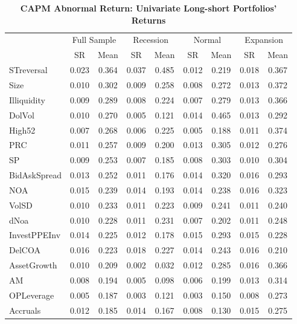 \begin{table}[H]
  \centering
  \footnotesize
  \caption{\textbf{CAPM Abnormal Return: Univariate Long-short Portfolios' Returns}}
  \label{table: capm univariate ls portfolio}
  \begin{tabular}{lcc|cc|cc|cc}
  \hline
      ~ & \multicolumn{2}{c}{Full Sample} & \multicolumn{2}{c}{Recession} & \multicolumn{2}{c}{Normal} & \multicolumn{2}{c}{Expansion} \\
      ~ & SR & Mean & SR & Mean & SR & Mean & SR & Mean \\ \hline
      STreversal & 0.023 & 0.364 & 0.037 & 0.485 & 0.012 & 0.219 & 0.018 & 0.367 \\ 
      Size & 0.010 & 0.302 & 0.009 & 0.258 & 0.008 & 0.272 & 0.013 & 0.372 \\ 
      Illiquidity & 0.009 & 0.289 & 0.008 & 0.224 & 0.007 & 0.279 & 0.013 & 0.366 \\ 
      DolVol & 0.010 & 0.270 & 0.005 & 0.121 & 0.014 & 0.465 & 0.013 & 0.292 \\ 
      High52 & 0.007 & 0.268 & 0.006 & 0.225 & 0.005 & 0.188 & 0.011 & 0.374 \\ 
      PRC & 0.011 & 0.257 & 0.009 & 0.200 & 0.013 & 0.305 & 0.012 & 0.276 \\ 
      SP & 0.009 & 0.253 & 0.007 & 0.185 & 0.008 & 0.303 & 0.010 & 0.304 \\ 
      BidAskSpread & 0.013 & 0.252 & 0.011 & 0.176 & 0.014 & 0.320 & 0.016 & 0.293 \\ 
      NOA & 0.015 & 0.239 & 0.014 & 0.193 & 0.014 & 0.238 & 0.016 & 0.323 \\ 
      VolSD & 0.010 & 0.233 & 0.011 & 0.223 & 0.009 & 0.241 & 0.011 & 0.240 \\ 
      dNoa & 0.010 & 0.228 & 0.011 & 0.231 & 0.007 & 0.202 & 0.011 & 0.248 \\ 
      InvestPPEInv & 0.014 & 0.225 & 0.012 & 0.178 & 0.015 & 0.293 & 0.015 & 0.228 \\ 
      DelCOA & 0.016 & 0.223 & 0.018 & 0.227 & 0.014 & 0.243 & 0.016 & 0.210 \\ 
      AssetGrowth & 0.010 & 0.209 & 0.002 & 0.032 & 0.012 & 0.285 & 0.016 & 0.366 \\ 
      AM & 0.008 & 0.194 & 0.005 & 0.098 & 0.006 & 0.199 & 0.013 & 0.314 \\ 
      OPLeverage & 0.005 & 0.187 & 0.003 & 0.121 & 0.003 & 0.150 & 0.008 & 0.273 \\ 
      Accruals & 0.012 & 0.185 & 0.014 & 0.167 & 0.008 & 0.130 & 0.015 & 0.275 \\ 

\end{tabular}
\end{table}
